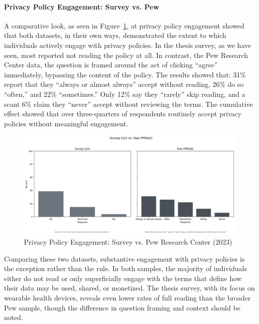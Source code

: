	\paragraph{Privacy Policy Engagement: Survey vs. Pew}			
	A comparative look, as seen in Figure~\ref{fig:Q10_pew_comparison}, at privacy policy engagement showed that both datasets, in their own ways, demonstrated the extent to which individuals actively engage with privacy policies.
	In the thesis survey, as we have seen, most reported not reading the policy at all. In contrast, the Pew Research Center data, the question is framed around the act of clicking “agree” immediately, bypassing the content of the policy. The results showed that: 31\% report that they “always or almost always” accept without reading, 26\% do so “often,” and 22\% “sometimes.” Only 12\% say they “rarely” skip reading, and a scant 6\% claim they “never” accept without reviewing the terms. The cumulative effect showed that over three-quarters of respondents routinely accept privacy policies without meaningful engagement.
	\begin{figure}[ht]\centering
		\includegraphics[width=0.7\linewidth]{figures/img/pew_comparison_plots/compare_10_vs_PPREAD.png}
		\caption{Privacy Policy Engagement: Survey vs. Pew Research Center (2023)}
		\label{fig:Q10_pew_comparison}
	\end{figure}
	Comparing these two datasets, substantive engagement with privacy policies is the exception rather than the rule. In both samples, the majority of individuals either do not read or only superficially engage with the terms that define how their data may be used, shared, or monetized. The thesis survey, with its focus on wearable health devices, reveals even lower rates of full reading than the broader Pew sample, though the difference in question framing and context should be noted.
